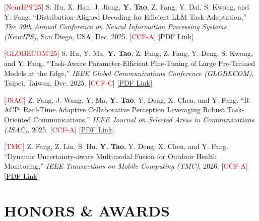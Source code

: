 \documentclass[letterpaper,11pt]{article}
\newcommand{\pdflink}[1]{\href{#1}{[PDF Link]}}
\begin{document}
{{{{{{\begin{justify}
    \normalsize
    [\textcolor{red}{NeurIPS'25}] S. Hu, X. Han, J. Jiang, \textbf{Y. Tao}, Z. Fang, Y. Dai, S. Kwong, and Y. Fang. ``Distribution-Aligned Decoding for Efficient LLM Task Adaptation,'' \textit{The 39th Annual Conference on Neural Information Processing Systems (NeurIPS)}, San Diego, USA, Dec. 2025. [\textcolor{red}{CCF-A}] \pdflink{https://arxiv.org/pdf/2509.15888}
\end{justify}

\begin{justify}
    \normalsize
    [\textcolor{red}{GLOBECOM'25}] S. Hu, Y. Ma, \textbf{Y. Tao}, Z. Fang, Z. Fang, Y. Deng, S. Kwong, and Y. Fang. ``Task-Aware Parameter-Efficient Fine-Tuning of Large Pre-Trained Models at the Edge,'' \textit{IEEE Global Communications Conference (GLOBECOM)}, Taipei, Taiwan, Dec. 2025. [\textcolor{red}{CCF-C}] \pdflink{https://arxiv.org/pdf/2504.03718}
\end{justify}

\begin{justify}
    \normalsize
    [\textcolor{red}{JSAC}] Z. Fang, J. Wang, Y. Ma, \textbf{Y. Tao}, Y. Deng, X. Chen, and Y. Fang. ``R-ACP: Real-Time Adaptive Collaborative Perception Leveraging Robust Task-Oriented Communications,'' \textit{IEEE Journal on Selected Areas in Communications (JSAC)}, 2025. [\textcolor{red}{CCF-A}] \pdflink{https://arxiv.org/pdf/2410.04168}
\end{justify}

\begin{justify}
    \normalsize
    [\textcolor{red}{TMC}] Z. Fang, Z. Lin, S. Hu, \textbf{Y. Tao}, Y. Deng, X. Chen, and Y. Fang. ``Dynamic Uncertainty-aware Multimodal Fusion for Outdoor Health Monitoring,'' \textit{IEEE Transactions on Mobile Computing (TMC)}, 2026. [\textcolor{red}{CCF-A}] \pdflink{https://arxiv.org/pdf/2508.09085}
\end{justify}

\section{\textbf{HONORS \& AWARDS}}
\vspace{2mm}

}}}}}}
\end{document}
